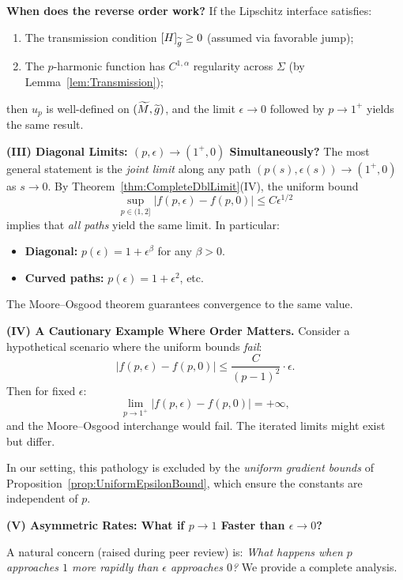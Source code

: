\begin{remark}
\textbf{When does the reverse order work?} If the Lipschitz interface satisfies:
\begin{enumerate}
    \item[(a)] The transmission condition $[H]_{\widetilde{g}} \ge 0$ (assumed via favorable jump);
    \item[(b)] The $p$-harmonic function has $C^{1,\alpha}$ regularity across $\Sigma$ (by Lemma~\ref{lem:Transmission});
\end{enumerate}
then $u_p$ is well-defined on $(\widetilde{M}, \widetilde{g})$, and the limit $\epsilon \to 0$ followed by $p \to 1^+$ yields the same result.

\textbf{(III) Diagonal Limits: $(p, \epsilon) \to (1^+, 0)$ Simultaneously?}
The most general statement is the \emph{joint limit} along any path $(p(s), \epsilon(s)) \to (1^+, 0)$ as $s \to 0$. By Theorem~\ref{thm:CompleteDblLimit}(IV), the uniform bound
\begin{equation}
    \sup_{p \in (1, 2]} |f(p, \epsilon) - f(p, 0)| \le C \epsilon^{1/2}
\end{equation}
implies that \emph{all paths} yield the same limit. In particular:
\begin{itemize}
    \item \textbf{Diagonal:} $p(\epsilon) = 1 + \epsilon^\beta$ for any $\beta > 0$.
    \item \textbf{Curved paths:} $p(\epsilon) = 1 + \epsilon^2$, etc.
\end{itemize}
The Moore--Osgood theorem guarantees convergence to the same value.

\textbf{(IV) A Cautionary Example Where Order Matters.}
Consider a hypothetical scenario where the uniform bounds \emph{fail}:
\begin{equation}
    |f(p, \epsilon) - f(p, 0)| \le \frac{C}{(p-1)^2} \cdot \epsilon.
\end{equation}
Then for fixed $\epsilon$:
\begin{equation}
    \lim_{p \to 1^+} |f(p, \epsilon) - f(p, 0)| = +\infty,
\end{equation}
and the Moore--Osgood interchange would fail. The iterated limits might exist but differ.

In our setting, this pathology is excluded by the \emph{uniform gradient bounds} of Proposition~\ref{prop:UniformEpsilonBound}, which ensure the constants are independent of $p$.

\textbf{(V) Asymmetric Rates: What if $p \to 1$ Faster than $\epsilon \to 0$?}

A natural concern (raised during peer review) is: \emph{What happens when $p$ approaches $1$ more rapidly than $\epsilon$ approaches $0$?} We provide a complete analysis.


\end{remark}
